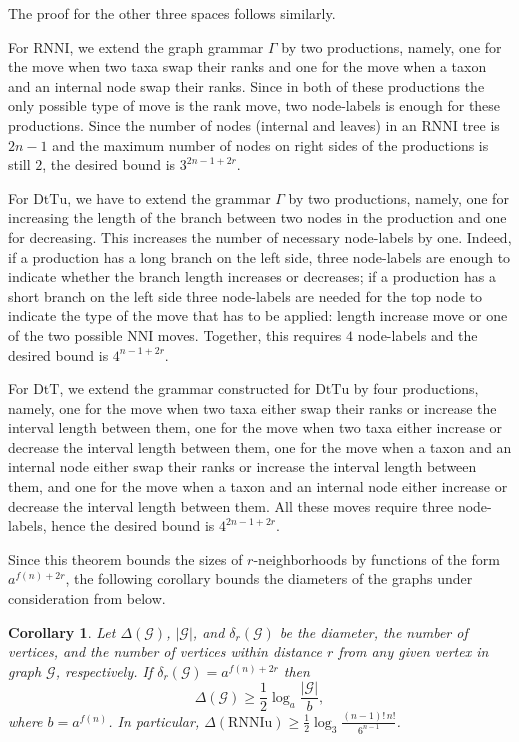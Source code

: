 \documentclass[11pt]{amsart}
\newtheorem{corollary}[lemma]{Corollary}
\theoremstyle{definition}
\newcommand{\nni}{\mathrm{NNI}}
\newcommand{\rnni}{\mathrm{RNNI}}
\newcommand{\rnniu}{\mathrm{RNNIu}}
\newcommand{\dtt}{\mathrm{DtT}}
\newcommand{\dttu}{\mathrm{DtTu}}
\newcommand{\G}{\mathcal{G}}
\begin{document}
The proof for the other three spaces follows similarly.

For $\rnni$, we extend the graph grammar $\Gamma$ by two productions, namely, one for the move when two taxa swap their ranks and one for the move when a taxon and an internal node swap their ranks.
Since in both of these productions the only possible type of move is the rank move, two node-labels is enough for these productions.
Since the number of nodes (internal and leaves) in an $\rnni$ tree is $2n - 1$ and the maximum number of nodes on right sides of the productions is still $2$, the desired bound is $3^{2n-1 + 2r}$.

For $\dttu$, we have to extend the grammar $\Gamma$ by two productions, namely, one for increasing the length of the branch between two nodes in the production and one for decreasing.
This increases the number of necessary node-labels by one.
Indeed, if a production has a long branch on the left side, three node-labels are enough to indicate whether the branch length increases or decreases; if a production has a short branch on the left side three node-labels are needed for the top node to indicate the type of the move that has to be applied: length increase move or one of the two possible $\nni$ moves.
Together, this requires $4$ node-labels and the desired bound is $4^{n-1 + 2r}$.

For $\dtt$, we extend the grammar constructed for $\dttu$ by four productions, namely, one for the move when two taxa either swap their ranks or increase the interval length between them, one for the move when two taxa either increase or decrease the interval length between them, one for the move when a taxon and an internal node either swap their ranks or increase the interval length between them, and one for the move when a taxon and an internal node either increase or decrease the interval length between them.
All these moves require three node-labels, hence the desired bound is $4^{2n-1 + 2r}$.
\endproof

Since this theorem bounds the sizes of $r$-neighborhoods by functions of the form $a^{f(n) + 2r}$, the following corollary bounds the diameters of the graphs under consideration from below.

\begin{corollary}
Let $\Delta(\G)$, $|\G|$, and $\delta_r(\G)$ be the diameter, the number of vertices, and the number of vertices within distance $r$ from any given vertex in graph $\G$, respectively.
If $\delta_r(\G) = a^{f(n) + 2r}$ then
\[
\Delta(\G) \geq \frac 12 \log_a\frac{|\G|}{b},
\]
where $b = a^{f(n)}$.
In particular, $\Delta(\rnniu) \geq \frac 12 \log_3\frac{(n-1)!\,n!}{6^{n-1}}$.
\end{corollary}
\end{document}
